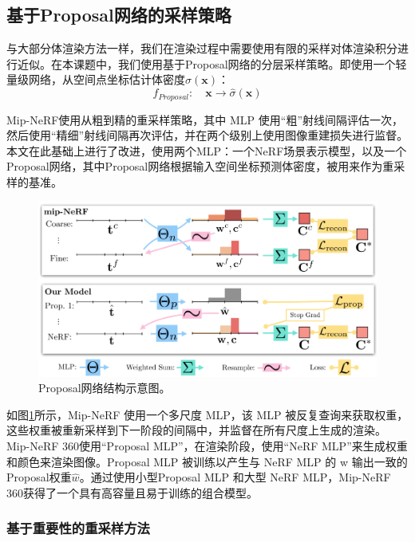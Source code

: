 \subsection{基于Proposal网络的采样策略}
与大部分体渲染方法一样，我们在渲染过程中需要使用有限的采样对体渲染积分进行近似。在本课题中，我们使用基于Proposal网络的分层采样策略。即使用一个轻量级网络，从空间点坐标估计体密度$\hat{\sigma}(\mathbf{x})$：
\begin{equation}
    f_{Proposal}:\quad \mathbf{x}\to\hat{\sigma}(\mathbf{x})
\end{equation}

Mip-NeRF\cite{barron_mip-nerf_2021}使用从粗到精的重采样策略，其中 MLP 使用“粗”射线间隔评估一次，然后使用“精细”射线间隔再次评估，并在两个级别上使用图像重建损失进行监督。本文在此基础上进行了改进，使用两个MLP：一个NeRF场景表示模型，以及一个Proposal网络，其中Proposal网络根据输入空间坐标预测体密度，被用来作为重采样的基准。

\begin{figure}[ht]
    \centering
    \includegraphics[width=\textwidth]{undergraduate-thesis/images/omni-nerf/mip-nerf360 proposal network.png}
    \caption{Proposal网络结构示意图。}
    \label{fig:related-work proposal network}
\end{figure}

如图\ref{fig:related-work proposal network}所示，Mip-NeRF 使用一个多尺度 MLP，该 MLP 被反复查询来获取权重，这些权重被重新采样到下一阶段的间隔中，并监督在所有尺度上生成的渲染。Mip-NeRF 360使用“Proposal MLP”，在渲染阶段，使用“NeRF MLP”来生成权重和颜色来渲染图像。Proposal MLP 被训练以产生与 NeRF MLP 的 w 输出一致的Proposal权重$\hat{w}$。通过使用小型Proposal MLP 和大型 NeRF MLP，Mip-NeRF 360获得了一个具有高容量且易于训练的组合模型。

\subsubsection{基于重要性的重采样方法}


